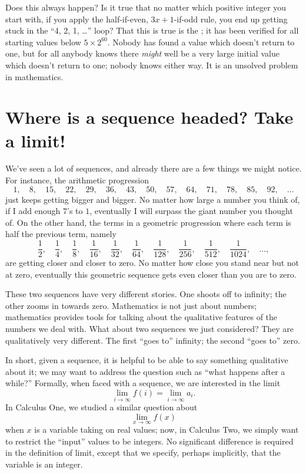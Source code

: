 Does this always happen?  Is it true that no matter which positive
integer you start with, if you apply the half-if-even, $3x+1$-if-odd
rule, you end up getting stuck in the ``4, 2, 1, \ldots'' loop?  That
this is true is the ; it has been
verified for all starting values below $5 \times 2^{60}$.  Nobody has
found a value which doesn't return to one, but for all anybody knows
there \textit{might} well be a very large initial value which doesn't
return to one; nobody knows either way.  It is an unsolved
problem in mathematics.

\section{Where is a sequence headed?  Take a limit!}
\label{section:limits}

We've seen a lot of sequences, and already there are a few things we
might notice.  For instance, the arithmetic progression
$$
1,\quad 8,\quad 15,\quad 22,\quad 29,\quad 36,\quad 43,\quad 50,\quad 57,\quad 64,\quad 71,\quad 78,\quad 85,\quad 92,\quad \ldots
$$
just keeps getting bigger and bigger.  No matter how large a number
you think of, if I add enough $7$'s to $1$, eventually I will surpass
the giant number you thought of.  On the other hand, the terms in a geometric progression where each term is half the previous term, namely
$$
\frac{1}{2},\quad \frac{1}{4},\quad \frac{1}{8},\quad \frac{1}{16},\quad \frac{1}{32},\quad \frac{1}{64},\quad \frac{1}{128},\quad \frac{1}{256},\quad \frac{1}{512},\quad \frac{1}{1024},\quad \ldots ,
$$
are getting closer and closer to zero.  No matter how close you stand
near but not at zero, eventually this geometric sequence gets even closer than you
are to zero.

These two sequences have very different stories.  One shoots off to
infinity; the other zooms in towards zero.  Mathematics is not just
about numbers; mathematics provides tools for talking about the
qualitative features of the numbers we deal with.  What about two
sequences we just considered?  They are qualitatively very different.  The first ``goes to''
infinity; the second ``goes to'' zero.


In short, given a sequence, it is helpful to be able to say something
qualitative about it; we may want to address the question such as
``what happens after a while?'' Formally, when faced with a sequence,
we are interested in the limit
$$\lim_{i\to \infty} f(i) = \lim_{i\to\infty} a_i.$$
In Calculus One, we studied a similar question about
$$\lim_{x\to\infty} f(x)$$
when $x$ is a variable taking on real values; now, in Calculus Two, we
simply want to restrict the ``input'' values to be integers. No
significant difference is required in the definition of limit, except
that we specify, perhaps implicitly, that the variable is an integer.

